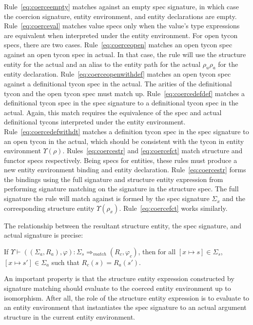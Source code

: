 Rule~\ref{eq:coerceempty} matches against an empty spec signature, in
which case the coercion signature, entity environment, and entity
declarations are empty. Rule~\ref{eq:coerceval} matches value specs
only when the value's type expressions are equivalent when interpreted
under the entity environment. For open tycon specs, there are two
cases. Rule~\ref{eq:coerceopen} matches an open tycon spec against an
open tycon spec in actual. In that case, the rule will use the
structure entity for the actual and an alias to the entity path for
the actual $\rho_u\rho_a$ for the entity
declaration. Rule~\ref{eq:coerceopenwithdef} matches an open tycon
spec against a definitional tycon spec in the actual. The arities of
the definitional tycon and the open tycon spec must match
up. Rule~\ref{eq:coercedefdef} matches a definitional tycon spec in
the spec signature to a definitional tycon spec in the actual. Again,
this match requires the equivalence of the spec and actual
definitional tycons interpreted under the entity
environment. Rule~\ref{eq:coercedefwithdt} matches a definition tycon
spec in the spec signature to an open tycon in the actual, which should be consistent with the tycon in entity environment $\Upsilon(\rho)$. Rules~\ref{eq:coercestr} and \ref{eq:coercefct} match structure and functor specs respectively. Being specs for entities, these rules must produce a new entity environment binding and entity declaration. Rule~\ref{eq:coercestr} forms the bindings using the full signature and structure entity expression from performing signature matching on the signature in the structure spec. The full signature the rule will match against is formed by the spec signature $\Sigma_x$ and the corresponding structure entity $\Upsilon(\rho_x)$. Rule~\ref{eq:coercefct} works similarly. 

The relationship between the resultant structure entity, the spec
signature, and actual signature is precise:

\begin{lemma}
If $\Upsilon \vdash ((\Sigma_a,R_a),\varphi) : \Sigma_s \Rightarrow_{match} (R_c,
\varphi_c)$, then for all $[x\mapsto s]\in\Sigma_s$, $[x\mapsto
s']\in\Sigma_a$ such that $R_c(s)=R_a(s')$.
\end{lemma}

An important property is that the structure entity expression
constructed by signature matching should evaluate to the coerced
entity environment up to isomorphism. After all, the role of the structure entity
expression is to evaluate to an entity environment that instantiates
the spec signature to an actual argument structure in the current
entity environment.  

